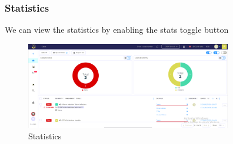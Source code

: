 \documentclass{article}
\begin{document}
\subsubsection*{Statistics}
We can view the statistics by enabling the stats toggle button
\begin{figure}[H]
    \centering
    \includegraphics[width=0.8\textwidth]{img32.png}
    \caption{Statistics}
    \label{fig:emptycase}
\end{figure}
\end{document}
